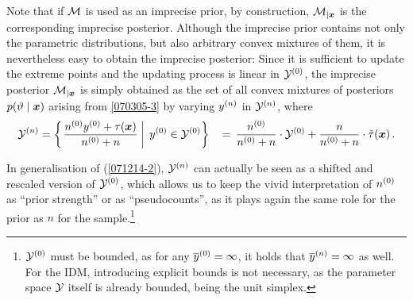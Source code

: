\begin{remark}
Note that if ${\cal M}$ is used as an imprecise prior, by
construction, ${\cal M}_{|{\bm x}}$ is the corresponding imprecise
posterior. Although the imprecise prior contains not only
the parametric distributions, but also arbitrary convex mixtures of them,
it is nevertheless easy to obtain the imprecise posterior: Since it
is sufficient to update the extreme points and the updating process
is linear in $\mathcal{Y}^{(0)}$, the imprecise posterior ${\cal M}_{|{\bm x}}$ is simply
obtained as the set of all convex mixtures of posteriors
$p(\vartheta\mid{\bm x})$ arising from \eqref{070305-3} by varying
$y^{(n)}$ in $\mathcal{Y}^{(n)}$,
where%
\begin{alignat}{3}
\YN &= \left\{ \left.\frac{\nz\yz
                  + \tau(\x)}{\nz+n} \;\right|\; \yz \in \YZ \right\}
               &\,=\, \frac{\nz}{\nz + n} \cdot \YZ
                + \frac{n}{\nz + n} \cdot \ttau(\x)\,.
\label{equ:shifttrans}%
\end{alignat}%
\end{remark}
%
%
In generalisation of (\ref{071214-2}), $\mathcal{Y}^{(n)}$ can
actually be seen as a shifted and rescaled version of $\mathcal{Y}^{(0)}$,
which allows us to keep the vivid interpretation of  $n^{(0)}$ as
``prior strength'' or as ``pseudocounts'', as it plays again the same role
for the prior as $n$ for the sample.\footnote{$\mathcal{Y}^{(0)}$ must be
bounded, as for any $\overline{y}^{(0)} = \infty$, it holds that
$\overline{y}^{(n)} = \infty$ as well. For the IDM, introducing explicit
bounds is not necessary, as the parameter space $\mathcal{Y}$ itself
is already bounded, being the unit simplex.}
%
%
%
